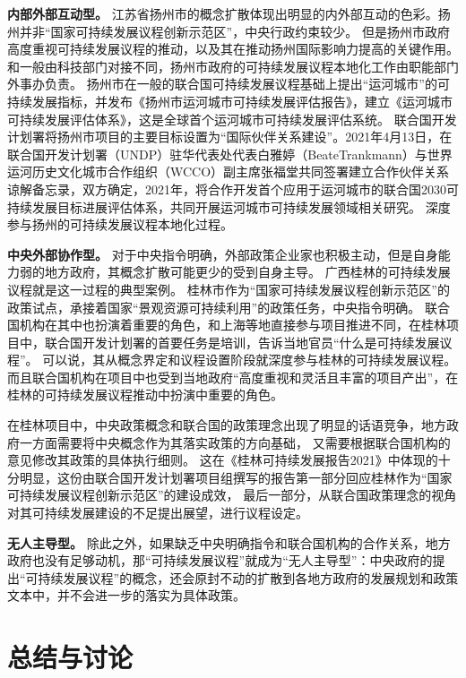 \documentclass[
  12pt,
]{ctexart}
\begin{document}
\textbf{内部外部互动型。}
江苏省扬州市的概念扩散体现出明显的内外部互动的色彩。扬州并非``国家可持续发展议程创新示范区''，中央行政约束较少。
但是扬州市政府高度重视可持续发展议程的推动，以及其在推动扬州国际影响力提高的关键作用。
和一般由科技部门对接不同，扬州市政府的可持续发展议程本地化工作由职能部门外事办负责。
扬州市在一般的联合国可持续发展议程基础上提出``运河城市''的可持续发展指标，并发布《扬州市运河城市可持续发展评估报告》，建立《运河城市可持续发展评估体系》，这是全球首个运河城市可持续发展评估系统。
联合国开发计划署将扬州市项目的主要目标设置为``国际伙伴关系建设''。2021年4月13日，在联合国开发计划署（UNDP）驻华代表处代表白雅婷（BeateTrankmann）与世界运河历史文化城市合作组织（WCCO）副主席张福堂共同签署建立合作伙伴关系谅解备忘录，双方确定，2021年，将合作开发首个应用于运河城市的联合国2030可持续发展目标进展评估体系，共同开展运河城市可持续发展领域相关研究。
深度参与扬州的可持续发展议程本地化过程。

\textbf{中央外部协作型。}
对于中央指令明确，外部政策企业家也积极主动，但是自身能力弱的地方政府，其概念扩散可能更少的受到自身主导。
广西桂林的可持续发展议程就是这一过程的典型案例。
桂林市作为``国家可持续发展议程创新示范区''的政策试点，承接着国家``景观资源可持续利用''的政策任务，中央指令明确。
联合国机构在其中也扮演着重要的角色，和上海等地直接参与项目推进不同，在桂林项目中，联合国开发计划署的首要任务是培训，告诉当地官员``什么是可持续发展议程''。
可以说，其从概念界定和议程设置阶段就深度参与桂林的可持续发展议程。
而且联合国机构在项目中也受到当地政府``高度重视和灵活且丰富的项目产出''，在桂林的可持续发展议程推动中扮演中重要的角色。

在桂林项目中，中央政策概念和联合国的政策理念出现了明显的话语竞争，地方政府一方面需要将中央概念作为其落实政策的方向基础，
又需要根据联合国机构的意见修改其政策的具体执行细则。
这在《桂林可持续发展报告2021》中体现的十分明显，这份由联合国开发计划署项目组撰写的报告第一部分回应桂林作为``国家可持续发展议程创新示范区''的建设成效，
最后一部分，从联合国政策理念的视角对其可持续发展建设的不足提出展望，进行议程设定。

\textbf{无人主导型。}
除此之外，如果缺乏中央明确指令和联合国机构的合作关系，地方政府也没有足够动机，那``可持续发展议程''就成为``无人主导型''：中央政府的提出``可持续发展议程''的概念，还会原封不动的扩散到各地方政府的发展规划和政策文本中，并不会进一步的落实为具体政策。

\hypertarget{ux603bux7ed3ux4e0eux8ba8ux8bba}{%
\section{总结与讨论}\label{ux603bux7ed3ux4e0eux8ba8ux8bba}}
\end{document}
